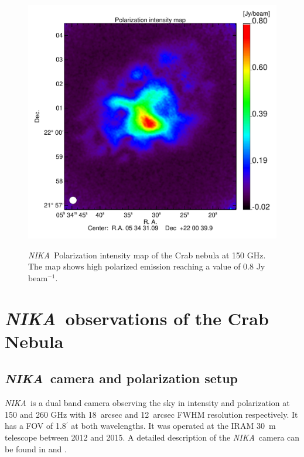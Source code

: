 \documentclass[twocolumn,traditabstract]{aa}
\def\NIKA{\textit{NIKA}}
\begin{document}
 \begin{figure}
  \centering
      {\includegraphics[width=0.75\linewidth,keepaspectratio]{figures/Crab_ipol2_2mm.pdf}}
\caption{\NIKA\ Polarization intensity map of the  Crab nebula at 150 GHz. The map shows high polarized emission reaching a value of 0.8 Jy beam$^{-1}$.}
\label{crab_ipol_maps}		
  \end{figure}
 

\section{\NIKA\ observations of the Crab Nebula}\label{sec:NIKA observations}
\subsection{\NIKA\ camera and polarization setup}\label{sec:nika camera}
\NIKA\ is a dual band camera observing the sky in intensity and polarization at
150 and 260 GHz with 18~arcsec and 12~arcsec FWHM resolution respectively. It
has a FOV of 1.8$^{\prime}$ at both wavelengths. It was operated at the
IRAM 30~m telescope between 2012 and 2015. A detailed description of the
\NIKA\ camera can be found in \citet{monfardini2010, monfardini2011} and
\citet{catalano2014}.
\end{document}
